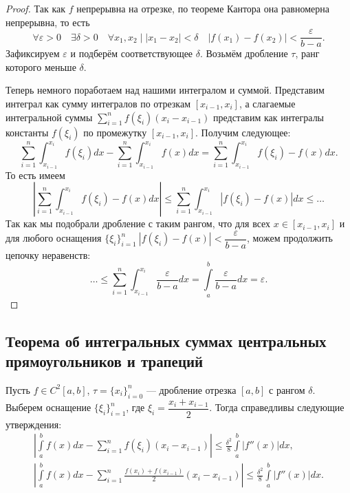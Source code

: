 \begin{proof}
	Так как \(f\) непрерывна на отрезке, по теореме Кантора она равномерна непрерывна, то есть \[
	\forall \varepsilon > 0 \quad \exists \delta > 0 \quad \forall x_1, x_2 \mid |x_1 - x_2| < \delta \quad |f(x_1) - f(x_2)| < \frac{\varepsilon}{b - a}.
	\]
	Зафиксируем \(\varepsilon\) и подберём соответствующее \(\delta\). Возьмём дробление \(\tau\), ранг которого меньше \(\delta\).
	
	Теперь немного поработаем над нашими интегралом и суммой. Представим интеграл как сумму интегралов по отрезкам \([x_{i - 1}, x_i]\), а слагаемые интегральной суммы \(\sum\limits_{i = 1}^n f(\xi_i) (x_i - x_{i - 1})\) представим как интегралы константы \(f(\xi_i)\) по промежутку \([x_{i - 1}, x_i]\). Получим следующее: \[
	\sum_{i = 1}^n \int_{x_{i - 1}}^{x_i} f(\xi_i) dx - \sum_{i = 1}^n \int_{x_{i - 1}}^{x_i} f(x) dx = \sum_{i = 1}^n \int_{x_{i - 1}}^{x_i} f(\xi_i) - f(x) dx.
	\]
	То есть имеем \[
	\left|\sum_{i = 1}^n \int_{x_{i - 1}}^{x_i} f(\xi_i) - f(x) dx \right| \leqslant \sum_{i = 1}^n \int_{x_{i - 1}}^{x_i} \left|f(\xi_i) - f(x) \right| dx \leqslant \ldots
	\]
	Так как мы подобрали дробление с таким рангом, что для всех \(x \in [x_{i - 1}, x_i]\) и для любого оснащения \(\{\xi_i\}_{i = 1}^n \ |f(\xi_i) - f(x)| < \dfrac{\varepsilon}{b - a}\), можем продолжить цепочку неравенств: \[
	\ldots \leqslant \sum_{i = 1}^n \int_{x_{i - 1}}^{x_i} \frac{\varepsilon}{b - a} dx = \int\limits_a^b \frac{\varepsilon}{b - a} dx = \varepsilon.
	\]
\end{proof}

\subsection{Теорема об интегральных суммах центральных прямоугольников и трапеций}

\hypertarget{trap}{}
\begin{theorem}
	Пусть \(f \in C^2 [a, b]\), \(\tau = \{x_i\}_{i = 0}^n\) --- дробление отрезка \([a, b]\) с рангом \(\delta\). Выберем оснащение \(\{\xi_i\}_{i = 1}^n\), где \(\xi_i = \dfrac{x_i + x_{i - 1}}{2}\). Тогда справедливы следующие утверждения:
	\begin{gather}
		\label{intsum1}
		\left|\int\limits_a^b f(x) dx - \sum_{i = 1}^n f(\xi_i) (x_i - x_{i - 1}) \right| \leqslant \frac{\delta^2}{8} \int\limits_a^b |f''(x)| dx, \\
		\label{intsum2}
		\left|\int\limits_a^b f(x) dx - \sum_{i = 1}^n \frac{f(x_i) + f(x_{i - 1})}{2} (x_i - x_{i - 1})\right| \leqslant \frac{\delta^2}{8} \int\limits_a^b |f''(x)| dx.
	\end{gather}
\end{theorem}

